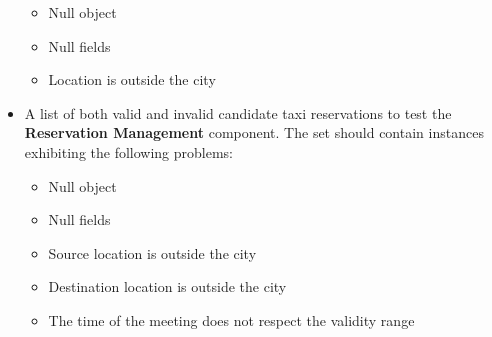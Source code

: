 \begin{itemize}
\begin{itemize}
		\item Null object
		\item Null fields
		\item Location is outside the city
		\end{itemize}
	\item A list of both valid and invalid candidate taxi reservations to test the \textbf{Reservation Management} component. The set should contain instances exhibiting the following problems: 
		\begin{itemize}
		\item Null object
		\item Null fields
		\item Source location is outside the city
		\item Destination location is outside the city
		\item The time of the meeting does not respect the validity range
		\end{itemize}		
\end{itemize}